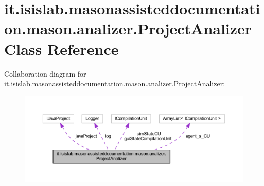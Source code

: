 \hypertarget{classit_1_1isislab_1_1masonassisteddocumentation_1_1mason_1_1analizer_1_1_project_analizer}{\section{it.\-isislab.\-masonassisteddocumentation.\-mason.\-analizer.\-Project\-Analizer Class Reference}
\label{classit_1_1isislab_1_1masonassisteddocumentation_1_1mason_1_1analizer_1_1_project_analizer}
}


Collaboration diagram for it.\-isislab.\-masonassisteddocumentation.\-mason.\-analizer.\-Project\-Analizer\-:
\nopagebreak
\begin{figure}[H]
\begin{center}
\leavevmode
\includegraphics[width=350pt]{classit_1_1isislab_1_1masonassisteddocumentation_1_1mason_1_1analizer_1_1_project_analizer__coll__graph}
\end{center}
\end{figure}
